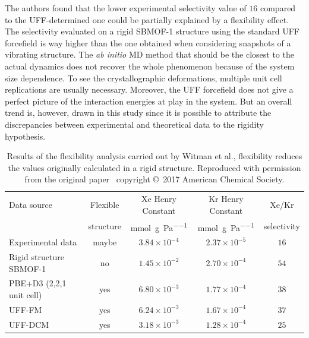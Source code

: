 \documentclass[main]{subfiles}
\begin{document}
The authors found that the lower experimental selectivity value of $16$ compared to the UFF-determined one could be partially explained by a flexibility effect. The selectivity evaluated on a rigid SBMOF-1 structure using the standard UFF forcefield is way higher than the one obtained when considering snapshots of a vibrating structure. The \emph{ab initio} MD method that should be the closest to the actual dynamics does not recover the whole phenomenon because of the system size dependence. To see the crystallographic deformations, multiple unit cell replications are usually necessary. Moreover, the UFF forcefield does not give a perfect picture of the interaction energies at play in the system. But an overall trend is, however, drawn in this study since it is possible to attribute the discrepancies between experimental and theoretical data to the rigidity hypothesis.

\begin{table}[t]
  \centering
  \small
  \begin{tabular}{|l|c|c|c|c|}
  \hline
    Data source & Flexible &  Xe Henry Constant &  Kr Henry Constant &  Xe/Kr \\
      & structure &  \si{\mmol\per\g\per\Pa} &  \si{\mmol\per\g\per\Pa} &  selectivity \\
  \hline
    Experimental data\autocite{Banerjee_2016} & maybe &  $3.84\times 10^{-4}$ &  $2.37\times 10^{-5}$ &  $16$ \\
  \hline
    Rigid structure SBMOF-1\autocite{Banerjee_2016} & no &  $1.45\times 10^{-2}$ &  $2.70\times 10^{-4}$ &  $54$ \\
    PBE+D3 (2,2,1 unit cell) & yes &  $6.80\times 10^{-3}$ &  $1.77\times 10^{-4}$ &  $38$ \\
    UFF-FM & yes &  $6.24\times 10^{-3}$ &  $1.67\times 10^{-4}$ &  $37$ \\
    UFF-DCM & yes &  $3.18\times 10^{-3}$ &  $1.28\times 10^{-4}$ &  $25$ \\
  \hline
\end{tabular}
\caption{ Results of the flexibility analysis carried out by Witman et al., flexibility reduces the values originally calculated in a rigid structure. Reproduced with permission from the original paper~\cite{Witman_2017} copyright \copyright\ 2017 American Chemical Society.}
\label{table:witman_sbmof}
\end{table}
\end{document}
